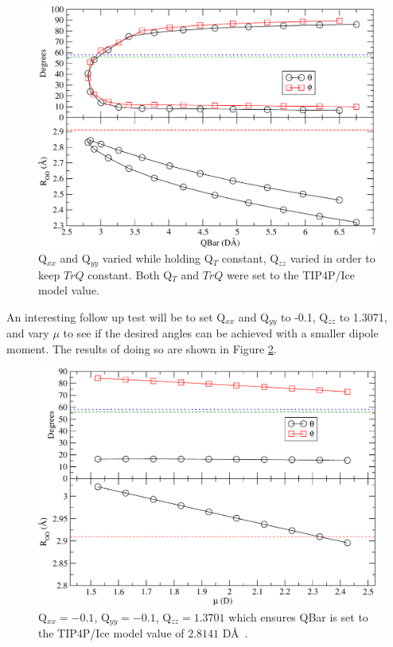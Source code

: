 \begin{figure}[h!]
\includegraphics[width=\linewidth]{Figures/Test5_plot2.pdf}
\caption{\label{fig:QBar2}Q$_{xx}$ and Q$_{yy}$ varied while holding Q$_T$ constant, Q$_{zz}$ varied in order to keep $TrQ$ constant. Both Q$_T$ and $TrQ$ were set to the TIP4P/Ice model value.}
\end{figure} 

An interesting follow up test will be 
to set Q$_{xx}$ and Q$_{yy}$ to -0.1, Q$_{zz}$ to 1.3071, and vary $\mu$ to 
see if the desired angles can be achieved with a smaller dipole moment. The
results of doing so are shown in Figure \ref{fig:mu2}.

\begin{figure}[h!]
\includegraphics[width=\linewidth]{Figures/Test22_plot.pdf}
\caption{\label{fig:mu2} Q$_{xx} = -0.1$, Q$_{yy} = -0.1$, Q$_{zz} = 1.3701$ which ensures QBar is set to the TIP4P/Ice model value of $2.8141$ D\AA~.}
\end{figure}

